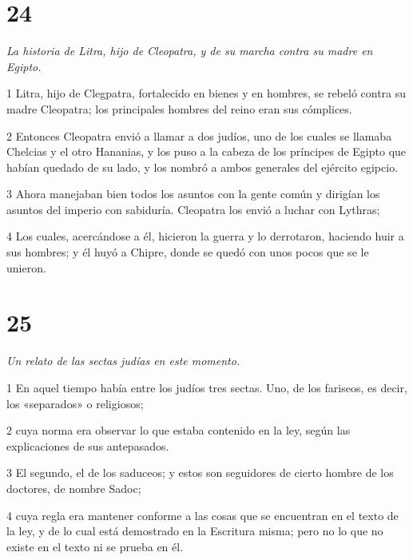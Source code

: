 \chapter{24}

\par \textit{La historia de Litra, hijo de Cleopatra, y de su marcha contra su madre en Egipto.}

\par 1 Litra, hijo de Clegpatra, fortalecido en bienes y en hombres, se rebeló contra su madre Cleopatra; los principales hombres del reino eran sus cómplices.

\par 2 Entonces Cleopatra envió a llamar a dos judíos, uno de los cuales se llamaba Chelcias y el otro Hananias, y los puso a la cabeza de los príncipes de Egipto que habían quedado de su lado, y los nombró a ambos generales del ejército egipcio.

\par 3 Ahora manejaban bien todos los asuntos con la gente común y dirigían los asuntos del imperio con sabiduría. Cleopatra los envió a luchar con Lythras;

\par 4 Los cuales, acercándose a él, hicieron la guerra y lo derrotaron, haciendo huir a sus hombres; y él huyó a Chipre, donde se quedó con unos pocos que se le unieron.

\chapter{25}

\par \textit{Un relato de las sectas judías en este momento.}

\par 1 En aquel tiempo había entre los judíos tres sectas. Uno, de los fariseos, es decir, los «separados» o religiosos;

\par 2 cuya norma era observar lo que estaba contenido en la ley, según las explicaciones de sus antepasados.

\par 3 El segundo, el de los saduceos; y estos son seguidores de cierto hombre de los doctores, de nombre Sadoc;

\par 4 cuya regla era mantener conforme a las cosas que se encuentran en el texto de la ley, y de lo cual está demostrado en la Escritura misma; pero no lo que no existe en el texto ni se prueba en él.

